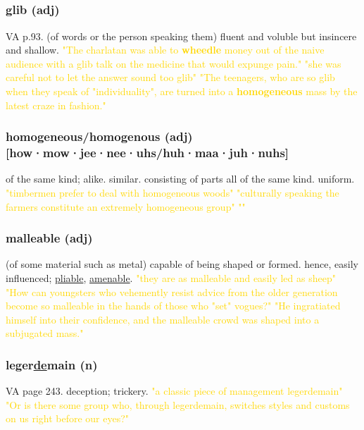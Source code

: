 \documentclass{proc}
\begin{document}
	\newpage
	\setcounter{section}{38}
	\setcounter{subsection}{0}
	
	
	\subsection{}
	\subsubsection{\textcolor{brickred}{glib} (adj)}
	VA p.93. (of words or the person speaking them) fluent and voluble but insincere and shallow.
	\textcolor{gold}{"The charlatan  was able to \textbf{wheedle} money out of the naive audience with a glib talk on the medicine that would expunge pain." "she was careful not to let the answer sound too glib" "The teenagers, who are so glib when they speak of 
		"individuality", are turned into a \textbf{homogeneous} mass by the 
		latest craze in fashion."}
	
	\subsubsection{\textcolor{brickred}{homogeneous/homogenous} (adj) [how·mow·jee·nee·uhs/huh·maa·juh·nuhs]}
	of the same kind; alike.
	similar. consisting of parts all of the same kind. uniform.
	\textcolor{gold}{
		"timbermen prefer to deal with homogeneous woods" "culturally speaking the farmers constitute an extremely homogeneous group" ""}
	
	\subsubsection{\textcolor{brickred}{malleable} (adj)}
	(of some material such as metal) capable of being shaped or formed. hence, easily influenced; \underline{pliable}, \underline{amenable}.
	\textcolor{gold}{"they are as malleable and easily led as sheep" "How can youngsters who vehemently resist advice from the older generation become so malleable in the hands of those  who  "set" vogues?" "He ingratiated himself into their confidence, and the malleable crowd was shaped into a subjugated mass."}
	
	\subsubsection{\textcolor{brickred}{leger\underline{de}main} (n)}
	VA page 243. deception; trickery.
	\textcolor{gold}{"a classic piece of management legerdemain" "Or is there some group who, through legerdemain, switches styles and customs on us right before our eyes?"}
	
\end{document}
